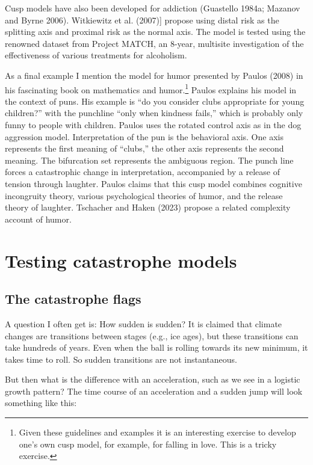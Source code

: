 \documentclass[
  a4paper,
  DIV=11,
  numbers=noendperiod]{scrreprt}
\begin{document}
Cusp models have also been developed for addiction (Guastello 1984a;
Mazanov and Byrne 2006). Witkiewitz et al. (2007){]} propose using
distal risk as the splitting axis and proximal risk as the normal axis.
The model is tested using the renowned dataset from Project MATCH, an
8-year, multisite investigation of the effectiveness of various
treatments for alcoholism.

As a final example I mention the model for humor presented by Paulos
(2008) in his fascinating book on mathematics and humor.\footnote{Given
  these guidelines and examples it is an interesting exercise to develop
  one's own cusp model, for example, for falling in love. This is a
  tricky exercise.} Paulos explains his model in the context of puns.
His example is ``do you consider clubs appropriate for young children?''
with the punchline ``only when kindness fails,'' which is probably only
funny to people with children. Paulos uses the rotated control axis as
in the dog aggression model. Interpretation of the pun is the behavioral
axis. One axis represents the first meaning of ``clubs,'' the other axis
represents the second meaning. The bifurcation set represents the
ambiguous region. The punch line forces a catastrophic change in
interpretation, accompanied by a release of tension through laughter.
Paulos claims that this cusp model combines cognitive incongruity
theory, various psychological theories of humor, and the release theory
of laughter. Tschacher and Haken (2023) propose a related complexity
account of humor.

\hypertarget{sec-Testing-catastrophe-models}{%
\section{Testing catastrophe
models}\label{sec-Testing-catastrophe-models}}

\hypertarget{sec-The-catastrophe-flags}{%
\subsection{The catastrophe flags}\label{sec-The-catastrophe-flags}}

A question I often get is: How sudden is sudden? It is claimed that
climate changes are transitions between stages (e.g., ice ages), but
these transitions can take hundreds of years. Even when the ball is
rolling towards its new minimum, it takes time to roll. So sudden
transitions are not instantaneous.

But then what is the difference with an acceleration, such as we see in
a logistic growth pattern? The time course of an acceleration and a
sudden jump will look something like this:
\end{document}
